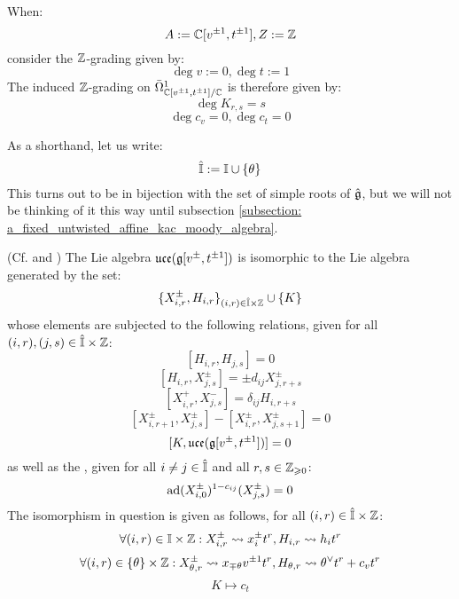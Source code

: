 \begin{remark}
            When:
                $$A := \mathbb{C}[v^{\pm 1}, t^{\pm 1}], Z := \mathbb{Z}$$
            consider the $\mathbb{Z}$-grading given by:
                $$\deg v := 0, \deg t := 1$$
            The induced $\mathbb{Z}$-grading on $\bar{\Omega}^1_{\mathbb{C}[v^{\pm 1}, t^{\pm 1}]/\mathbb{C}}$ is therefore given by:
                $$\deg K_{r, s} = s$$
                $$\deg c_v = 0, \deg c_t = 0$$
        \end{remark}

        \begin{convention}
            As a shorthand, let us write:
                $$\hat{\mathbb{I}} := \mathbb{I} \cup \{\theta\}$$
            This turns out to be in bijection with the set of simple roots of $\hat{\mathfrak{g}}$, but we will not be thinking of it this way until subsection \ref{subsection: a_fixed_untwisted_affine_kac_moody_algebra}.
        \end{convention}
        \begin{lemma} \label{lemma: chevalley_serre_presentation_for_central_extensions_of_multiloop_algebras}
            (Cf. \cite[Proposition 3.5]{moody_rao_yokonuma_vertex_representations_of_toroidal_lie_algebras} and \cite[Definition 3.5]{wendlandt_formal_shift_operators_on_yangian_doubles}) The Lie algebra $\mathfrak{uce}(\mathfrak{g}[v^{\pm}, t^{\pm 1}])$ is isomorphic to the Lie algebra generated by the set:
                $$\{ X_{i, r}^{\pm}, H_{i, r} \}_{(i, r) \in \hat{\simpleroots} \x \Z} \cup \{ K \}$$
            whose elements are subjected to the following relations, given for all $(i, r), (j, s) \in \hat{\simpleroots} \x \Z$:
                $$[ H_{i, r}, H_{j, s} ] = 0$$
                $$[ H_{i, r}, X_{j, s}^{\pm} ] = \pm d_{ij} X_{j, r + s}^{\pm}$$
                $$[ X_{i, r}^+, X_{j, s}^- ] = \delta_{ij} H_{i, r + s}$$
                $$[ X_{i, r + 1}^{\pm}, X_{j, s}^{\pm} ] - [ X_{i, r}^{\pm}, X_{j, s + 1}^{\pm} ] = 0$$
                $$[K, \mathfrak{uce}(\mathfrak{g}[v^{\pm}, t^{\pm 1}])] = 0$$
            as well as the , given for all $i \not = j \in \hat{\mathbb{I}}$ and all $r, s \in \mathbb{Z}_{\geqslant 0}$:
                $$\mathrm{ad}(X_{i, 0}^{\pm})^{1 - c_{ij}}( X_{j, s}^{\pm} ) = 0$$
            The isomorphism in question is given as follows, for all $(i, r) \in \hat{\simpleroots} \x \Z$:
                $$\forall (i, r) \in \simpleroots \x \Z: X_{i, r}^{\pm} \mapsto x_i^{\pm} t^r, H_{i, r} \mapsto h_i t^r$$
                $$\forall (i, r) \in \{\theta\} \x \Z: X_{\theta, r}^{\pm} \mapsto x_{\mp \theta} v^{\pm 1} t^r, H_{\theta, r} \mapsto \theta^{\vee} t^r + c_v t^r$$
                $$K \mapsto c_t$$
        \end{lemma}
